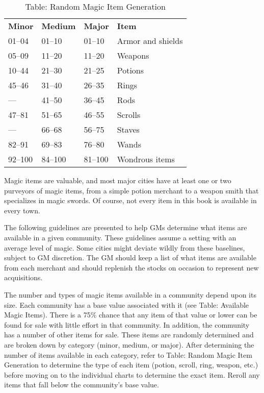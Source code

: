\begin{table}[]
\sffamily
\caption{Table: Random Magic Item Generation}
\begin{tabular}{llll}
\textbf{Minor} & \textbf{Medium} & \textbf{Major} & \textbf{Item}\\
01--04 & 01--10 & 01--10 & Armor and shields \\
 05--09 & 11--20 & 11--20 & Weapons \\
 10--44 & 21--30 & 21--25 & Potions \\
 45--46 & 31--40 & 26--35 & Rings \\
 --- & 41--50 & 36--45 & Rods \\
 47--81 & 51--65 & 46--55 & Scrolls \\
 --- & 66--68 & 56--75 & Staves \\
 82--91 & 69--83 & 76--80 & Wands \\
 92--100 & 84--100 & 81--100 & Wondrous items\\
\end{tabular}
\end{table}

Magic items are valuable, and most major cities have at least one or two purveyors of magic items, from a simple potion merchant to a weapon smith that specializes in magic swords. Of course, not every item in this book is available in every town. 
				
The following guidelines are presented to help GMs determine what items are available in a given community. These guidelines assume a setting with an average level of magic. Some cities might deviate wildly from these baselines, subject to GM discretion. The GM should keep a list of what items are available from each merchant and should replenish the stocks on occasion to represent new acquisitions.
				
The number and types of magic items available in a community depend upon its size. Each community has a base value associated with it (see Table: Available Magic Items). There is a 75\% chance that any item of that value or lower can be found for sale with little effort in that community. In addition, the community has a number of other items for sale. These items are randomly determined and are broken down by category (minor, medium, or major). After determining the number of items available in each category, refer to Table: Random Magic Item Generation to determine the type of each item (potion, scroll, ring, weapon, etc.) before moving on to the individual charts to determine the exact item. Reroll any items that fall below the community's base value.
				
